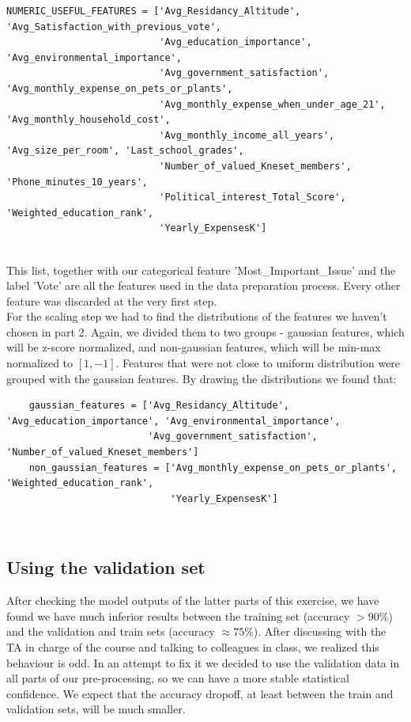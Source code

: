 \documentclass[12pt]{article}
\begin{document}
\begin{adjustbox}{max width=\linewidth}
\begin{lstlisting}
NUMERIC_USEFUL_FEATURES = ['Avg_Residancy_Altitude', 'Avg_Satisfaction_with_previous_vote',
                           'Avg_education_importance', 'Avg_environmental_importance',
                           'Avg_government_satisfaction', 'Avg_monthly_expense_on_pets_or_plants',
                           'Avg_monthly_expense_when_under_age_21', 'Avg_monthly_household_cost',
                           'Avg_monthly_income_all_years', 'Avg_size_per_room', 'Last_school_grades',
                           'Number_of_valued_Kneset_members', 'Phone_minutes_10_years',
                           'Political_interest_Total_Score', 'Weighted_education_rank',
                           'Yearly_ExpensesK']
\end{lstlisting}
\end{adjustbox}\\

This list, together with our categorical feature 'Most\_Important\_Issue' and the label 'Vote' are all the features used in the data preparation process. Every other feature was discarded at the very first step.\\
For the scaling step we had to find the distributions of the features we haven't chosen in part 2. Again, we divided them to two groups - gaussian features, which will be z-score normalized, and non-gaussian features, which will be min-max normalized to $[1, -1]$. Features that were not close to uniform distribution were grouped with the gaussian features. By drawing the distributions we found that:\\

\begin{adjustbox}{max width=\linewidth}
\begin{lstlisting}
    gaussian_features = ['Avg_Residancy_Altitude', 'Avg_education_importance', 'Avg_environmental_importance',
                         'Avg_government_satisfaction', 'Number_of_valued_Kneset_members']
    non_gaussian_features = ['Avg_monthly_expense_on_pets_or_plants', 'Weighted_education_rank',
                             'Yearly_ExpensesK']
\end{lstlisting}
\end{adjustbox}\\

\subsection{Using the validation set}
After checking the model outputs of the latter parts of this exercise, we have found we have much inferior results between the training set (accuracy $>90\%$) and the validation and train sets (accuracy $\approx 75\%$). 
After discussing with the TA in charge of the course and talking to colleagues in class, we realized this behaviour is odd. In an attempt to fix it we decided to use the validation data in all parts of our pre-processing, so we can have a more stable statistical confidence. We expect that the accuracy dropoff, at least between the train and validation sets, will be much smaller.
\end{document}
